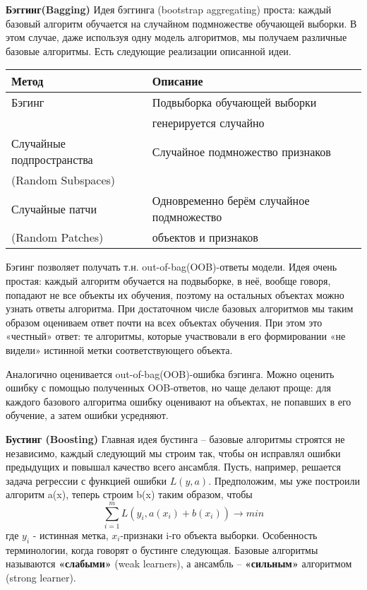 \textbf{Бэггинг(Bagging)}
Идея бэггинга (bootstrap aggregating) проста: каждый базовый алгоритм обучается на случайном подмножестве обучающей выборки. В этом случае, даже используя одну модель алгоритмов, мы получаем различные базовые алгоритмы. Есть следующие реализации описанной идеи. \\
\begin{center}
\begin{tabular}{l|l} 
    \hline\hline
    Метод  & Описание \\
     \hline\hline
    Бэгинг  & Подвыборка обучающей выборки \\
     & генерируется случайно \\
     \hline
    Случайные подпространства & Случайное подмножество признаков \\
    (Random Subspaces) & \\
    \hline
    Случайные патчи & Одновременно берём случайное подмножество \\
    (Random Patches) & объектов и признаков

 \end{tabular}
\end{center}

Бэгинг позволяет получать т.н. out-of-bag(OOB)-ответы модели. Идея очень простая: каждый алгоритм обучается на подвыборке, в неё, вообще говоря, попадают не все объекты их обучения, поэтому на остальных объектах можно узнать ответы алгоритма. При достаточном числе базовых алгоритмов мы таким образом оцениваем ответ почти на всех объектах обучения. При этом это «честный» ответ: те алгоритмы, которые участвовали в его формировании «не видели» истинной метки соответствующего объекта.

Аналогично оценивается out-of-bag(OOB)-ошибка бэгинга. Можно оценить ошибку с помощью полученных  OOB-ответов, но чаще делают проще: для каждого базового алгоритма ошибку оценивают на объектах, не попавших в его обучение, а затем ошибки усредняют.

\textbf{Бустинг (Boosting)}
Главная идея бустинга – базовые алгоритмы строятся не независимо, каждый следующий мы строим так, чтобы он исправлял ошибки предыдущих и повышал качество всего ансамбля. Пусть, например, решается задача регрессии с функцией ошибки $L(y, a)$. Предположим, мы уже построили алгоритм a(x), теперь строим b(x) таким образом, чтобы
\begin{equation}
    \displaystyle\sum_{i=1}^{m} L(y_i, a(x_i) + b(x_i)) \xrightarrow{} min
\end{equation}
где $y_i$ - истинная метка, $x_i$-признаки i-го объекта выборки.
Особенность терминологии, когда говорят о бустинге следующая. Базовые алгоритмы называются \textbf{«слабыми»} (weak learners),  а ансамбль – \textbf{«сильным»} алгоритмом (strong learner).

